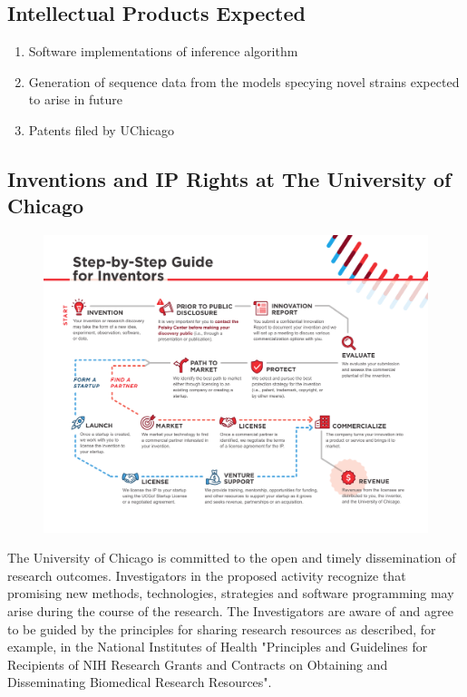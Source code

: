 \documentclass[onecolumn, compsoc,12pt]{IEEEtran}
\begin{document}
\subsection{Intellectual Products Expected}
\begin{enumerate}
[label=$\square$, leftmargin=0pt,
labelindent=0em, topsep=0.1em, labelsep=*, itemsep=.25em,itemindent=1em]\item Software implementations of \enet inference algorithm 
\item Generation of sequence data from the \enet models specying novel strains expected to arise in future
\item Patents filed by UChicago
\end{enumerate}
\subsection{Inventions and IP Rights at The University of Chicago}

\begin{figure}[t]
  \includegraphics[width=\textwidth]{Figures/Polsky-Inventor-Pathway}

  \vspace{-35pt}
  
  \label{figPolsky}
\end{figure}

The University of Chicago is committed to the open and timely dissemination of research outcomes. Investigators in the proposed activity recognize that promising new methods, technologies, strategies and software programming may arise during the course of the research. The Investigators are aware of and agree to be guided by the principles for sharing research resources as described, for example, in the National Institutes of Health "Principles and Guidelines for Recipients of NIH Research Grants and Contracts on Obtaining and Disseminating Biomedical Research Resources".
\end{document}
